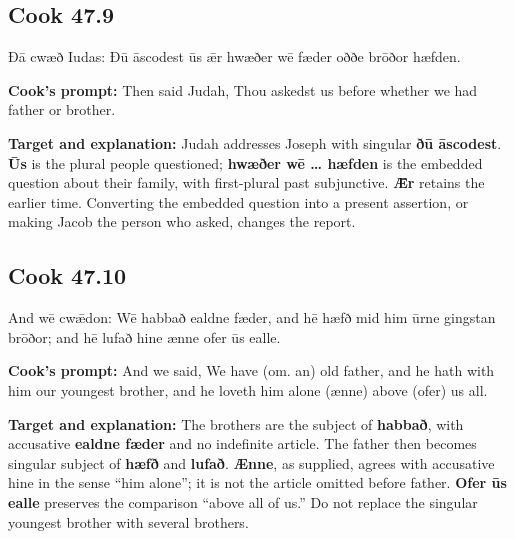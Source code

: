 \par\begin{minipage}{\linewidth}\raggedright
\subsection*{Cook 47.9}

Ðā cwæð Iudas: Ðū āscodest ūs ǣr hwæðer wē fæder oððe brōðor hæfden.

\textbf{Cook’s prompt:} Then said Judah, Thou askedst us before whether we had father or brother.

\textbf{Target and explanation:} Judah addresses Joseph with singular \textbf{ðū āscodest}. \textbf{Ūs} is the plural people questioned; \textbf{hwæðer wē … hæfden} is the embedded question about their family, with first-plural past subjunctive. \textbf{Ǣr} retains the earlier time. Converting the embedded question into a present assertion, or making Jacob the person who asked, changes the report.

\end{minipage}\par\addvspace{4pt}

\par\begin{minipage}{\linewidth}\raggedright
\subsection*{Cook 47.10}

And wē cwǣdon: Wē habbað ealdne fæder, and hē hæfð mid him ūrne gingstan brōðor; and hē lufað hine ænne ofer ūs ealle.

\textbf{Cook’s prompt:} And we said, We have (om. an) old father, and he hath with him our youngest brother, and he loveth him alone (ænne) above (ofer) us all.

\textbf{Target and explanation:} The brothers are the subject of \textbf{habbað}, with accusative \textbf{ealdne fæder} and no indefinite article. The father then becomes singular subject of \textbf{hæfð} and \textbf{lufað}. \textbf{Ænne}, as supplied, agrees with accusative hine in the sense “him alone”; it is not the article omitted before father. \textbf{Ofer ūs ealle} preserves the comparison “above all of us.” Do not replace the singular youngest brother with several brothers.

\end{minipage}\par\addvspace{4pt}

